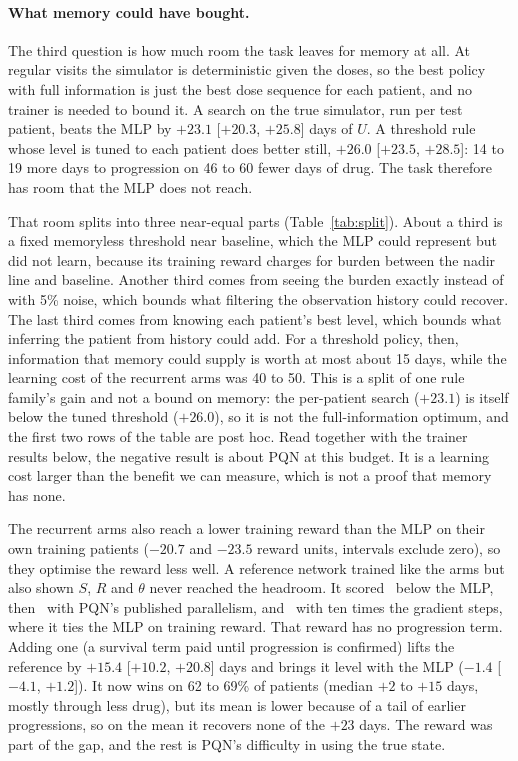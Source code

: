 \documentclass[10pt]{article}
\begin{document}
\paragraph{What memory could have bought.} The third question is how much room
the task leaves for memory at all. At regular visits the simulator is
deterministic given the doses, so the best policy with full information is just
the best dose sequence for each patient, and no trainer is needed to bound it. A
search on the true simulator, run per test patient, beats the MLP by $+23.1$
[$+20.3$, $+25.8$] days of $U$. A threshold rule whose level is tuned to each
patient does better still, $+26.0$ [$+23.5$, $+28.5$]: 14 to 19 more days to
progression on 46 to 60 fewer days of drug. The task therefore has room that the
MLP does not reach.

That room splits into three near-equal parts (Table~\ref{tab:split}). About a
third is a fixed memoryless threshold near baseline, which the MLP could
represent but did not learn, because its training reward charges for burden
between the nadir line and baseline. Another third comes from seeing the burden
exactly instead of with 5\% noise, which bounds what filtering the observation
history could recover. The last third comes from knowing each patient's best
level, which bounds what inferring the patient from history could add. For a
threshold policy, then, information that memory could supply is worth at most
about 15 days, while the learning cost of the recurrent arms was 40 to 50. This is a
split of one rule family's gain and not a bound on memory: the per-patient
search ($+23.1$) is itself below the tuned threshold ($+26.0$), so it is not the
full-information optimum, and the first two rows of the table are post hoc.
Read together with the trainer results below, the negative result is about
PQN at this budget. It is a learning cost larger than the benefit we can
measure, which is not a proof that memory has none.

The recurrent arms also reach a lower training reward than the MLP on their own
training patients ($-20.7$ and $-23.5$ reward units, intervals exclude zero), so
they optimise the reward less well.
A reference network trained like the arms but also shown $S$, $R$ and $\theta$
never reached the headroom. It scored \HFullZero\ below the MLP, then
\SThreeFull\ with PQN's published parallelism, and \TOneFull\ with ten times
the gradient steps, where it ties the MLP on training reward. That reward has no
progression term. Adding one (a survival term paid until progression is
confirmed) lifts the reference by $+15.4$ [$+10.2$, $+20.8$] days and brings it
level with the MLP ($-1.4$ [$-4.1$, $+1.2$]). It now wins on 62 to 69\% of
patients (median $+2$ to $+15$ days, mostly through less drug), but its mean is
lower because of a tail of earlier progressions, so on the mean it recovers none
of the $+23$ days. The reward was part of the gap, and the rest is PQN's
difficulty in using the true state.
\end{document}
